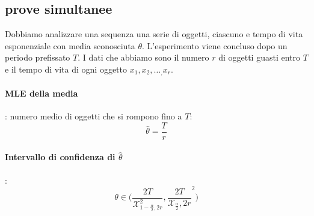 \documentclass[]{article}
\begin{document}
    \subsection{prove simultanee}
    Dobbiamo analizzare una sequenza una serie di oggetti, ciascuno e tempo di vita esponenziale con media sconosciuta $\theta$. L'esperimento viene concluso dopo un periodo prefissato $T$.
    I dati che abbiamo sono il numero $r$ di oggetti guasti entro $T$ e il tempo di vita di ogni oggetto $x_1,x_2, \ldots_, x_r$.
    \paragraph{MLE della media}: numero medio di oggetti che si rompono fino a $T$:
    $$\hat{\theta} = \frac{T}{r}$$
    \paragraph{Intervallo di confidenza di $\hat{\theta}$}:
    \[ \theta \in \Big( \frac{2T}{\mathcal X_{1-\frac{\alpha}{2},2r}^2}, \frac{2T}{\mathcal X_{\frac{\alpha}{2}},2r}^2  \Big) \]
    \newpage
\end{document}
